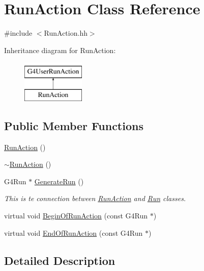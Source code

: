 \hypertarget{class_run_action}{\section{Run\-Action Class Reference}
\label{class_run_action}
}


{\ttfamily \#include $<$Run\-Action.\-hh$>$}

Inheritance diagram for Run\-Action\-:\begin{figure}[H]
\begin{center}
\leavevmode
\includegraphics[height=2.000000cm]{class_run_action}
\end{center}
\end{figure}
\subsection*{Public Member Functions}
\begin{DoxyCompactItemize}
\item 
\hyperlink{class_run_action_a535a70dd2811b2212753372dcb5a2f50}{Run\-Action} ()
\item 
\hyperlink{class_run_action_a6c584eb414c62a6238d5ea9a55601e1c}{$\sim$\-Run\-Action} ()
\item 
G4\-Run $\ast$ \hyperlink{class_run_action_ae4b3ac26ec0dbde4b1ebfc4f499c3b7c}{Generate\-Run} ()
\begin{DoxyCompactList}\small\item\em This is te connection between \hyperlink{class_run_action}{Run\-Action} and \hyperlink{class_run}{Run} classes. \end{DoxyCompactList}\item 
virtual void \hyperlink{class_run_action_a14b3433a6875194c4adfe1c222884f0d}{Begin\-Of\-Run\-Action} (const G4\-Run $\ast$)
\item 
virtual void \hyperlink{class_run_action_a49e3c5db63358317c3babca100163bd9}{End\-Of\-Run\-Action} (const G4\-Run $\ast$)
\end{DoxyCompactItemize}


\subsection{Detailed Description}


